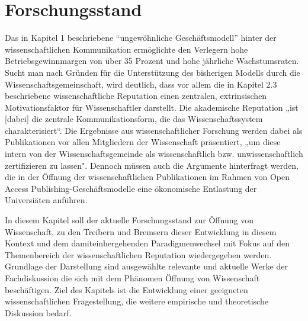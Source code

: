 \chapter{Forschungsstand}
Das in Kapitel 1 beschriebene “ungewöhnliche Geschäftsmodell” hinter der wissenschaftlichen Kommunikation ermöglichte den Verlegern hohe Betriebsgewinnmargen von über 35 Prozent\cite{russell_2008_business} und hohe jährliche Wachstumsraten\cite{Wellcome_Trust_2003}. Sucht man nach Gründen für die Unterstützung des bisherigen Modells durch die Wissenschaftsgemeinschaft, wird deutlich, dass vor allem die in Kapitel 2.3 beschriebene wissenschaftliche Reputation einen zentralen, extrinsischen Motivationsfaktor für Wissenschaftler darstellt\cite{minssen_2012_arbeit}. Die akademische Reputation „ist [dabei] die zentrale Kommunikationsform, die das Wissenschaftssystem charakterisiert“\cite{Rutenfranz_1997}. Die Ergebnisse aus wissenschaftlicher Forschung werden dabei als Publikationen vor allen Mitgliedern der Wissenschaft präsentiert, „um diese intern von der Wissenschaftsgemeinde als wissenschaftlich bzw. unwissenschaftlich zertifizieren zu lassen"\cite{Rutenfranz_1997}. Dennoch müssen auch die Argumente hinterfragt werden, die in der Öffnung der wissenschaftlichen Publikationen im Rahmen von Open Access Publishing-Geschäftsmodelle eine ökonomische Entlastung der Universiäten anführen\cite{bauer2006}.

In diesem Kapitel soll der aktuelle Forschungsstand zur Öffnung von Wissenschaft, zu den Treibern und Bremsern dieser Entwicklung in diesem Kontext und dem damiteinhergehenden Paradigmenwechsel mit Fokus auf den Themenbereich der wissenschaftlichen Reputation wiedergegeben werden. Grundlage der Darstellung sind ausgewählte relevante und aktuelle Werke der Fachdiskussion die sich mit dem Phänomen Öffnung von Wissenschaft beschäftigen. Ziel des Kapitels ist die Entwicklung einer geeigneten wissenschaftlichen Fragestellung, die weitere empirische und theoretische Diskussion bedarf.
